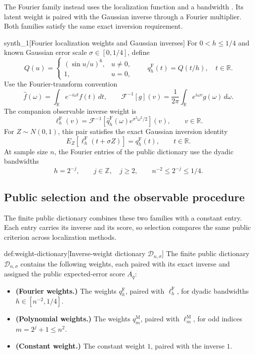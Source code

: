 The Fourier family instead uses the localization function  and a bandwidth . Its latent weight  is paired with the Gaussian inverse  through a Fourier multiplier. Both families satisfy the same exact inversion requirement.

\begin{definitionv}{synth_1}[Fourier localization weights and Gaussian inverses]
For \(0<h\le1/4\) and known Gaussian error scale \(\sigma\in[0,1/4]\), define
\[
Q(u)=
\begin{cases}
(\sin u/u)^6,&u\ne0,\\
1,&u=0,
\end{cases}
\qquad
q_h^{\mathrm F}(t)=Q(t/h),\quad t\in\mathbb R.
\]
Use the Fourier-transform convention
\[
\widehat f(\omega)=\int_{\mathbb R}e^{-i\omega t}f(t)\,dt,
\qquad
\mathcal F^{-1}[g](v)=\frac1{2\pi}
\int_{\mathbb R}e^{i\omega v}g(\omega)\,d\omega.
\]
The companion observable inverse weight is
\[
\ell_h^{\mathrm F}(v)
=\mathcal F^{-1}\!\left[
\widehat q_h^{\mathrm F}(\omega)e^{\sigma^2\omega^2/2}
\right](v),\qquad v\in\mathbb R.
\]
For \(Z\sim N(0,1)\), this pair satisfies the exact Gaussian inversion identity
\[
E_Z\!\left[\ell_h^{\mathrm F}(t+\sigma Z)\right]
=q_h^{\mathrm F}(t),\qquad t\in\mathbb R.
\]
At sample size \(n\), the Fourier entries of the public dictionary use the dyadic bandwidths
\[
h=2^{-j},\qquad j\in\mathbb Z,\quad j\ge2,
\qquad n^{-2}\le2^{-j}\le1/4.
\]
\end{definitionv}

\subsection{Public selection and the observable procedure}

The finite public dictionary  combines these two families with a constant entry. Each entry carries its inverse and its score, so selection compares the same public criterion across localization methods.

\begin{definitionv}{def:weight-dictionary}[Inverse-weight dictionary \(\mathcal D_{n,\sigma}\)]
The finite public dictionary \(\mathcal D_{n,\sigma}\) contains the following weights, each paired with its exact inverse and assigned the public expected-error score \(A_q\):
\begin{itemize}
\item \textbf{(Fourier weights.)} The weights \(q_h^{\mathrm F}\), paired with \(\ell_h^{\mathrm F}\), for dyadic bandwidths \(h\in[n^{-2},1/4]\).
\item \textbf{(Polynomial weights.)} The weights \(q_m^{\mathrm M}\), paired with \(\ell_m^{\mathrm M}\), for odd indices \(m=2^j+1\le n^2\).
\item \textbf{(Constant weight.)} The constant weight \(1\), paired with the inverse \(1\).
\end{itemize}
\end{definitionv}

